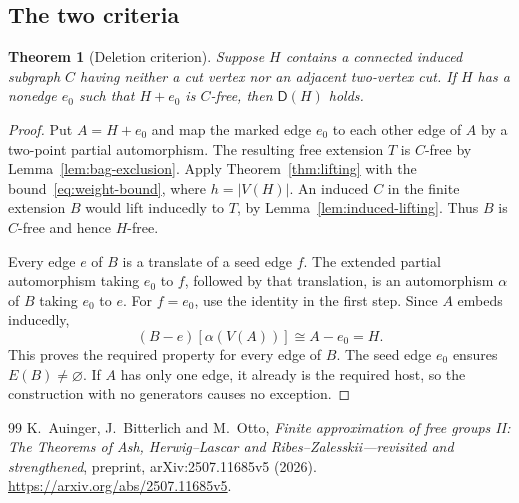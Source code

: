\documentclass[10pt,a4paper]{amsart}
\newtheorem{theorem}{Theorem}[section]
\newcommand{\Dsat}{\mathsf{D}}
\begin{document}
\subsection{The two criteria}


\begin{theorem}[Deletion criterion]\label{thm:deletion-criterion}
Suppose $H$ contains a connected induced subgraph $C$ having neither a cut vertex nor an adjacent two-vertex cut. If $H$ has a nonedge $e_0$ such that $H+e_0$ is $C$-free, then $\Dsat(H)$ holds.
\end{theorem}

\begin{proof}
Put $A=H+e_0$ and map the marked edge $e_0$ to each other edge of $A$ by a two-point partial automorphism. The resulting free extension $T$ is $C$-free by Lemma~\ref{lem:bag-exclusion}. Apply Theorem~\ref{thm:lifting} with the bound~\eqref{eq:weight-bound}, where $h=|V(H)|$. An induced $C$ in the finite extension $B$ would lift inducedly to $T$, by Lemma~\ref{lem:induced-lifting}. Thus $B$ is $C$-free and hence $H$-free.

Every edge $e$ of $B$ is a translate of a seed edge $f$. The extended partial automorphism taking $e_0$ to $f$, followed by that translation, is an automorphism $\alpha$ of $B$ taking $e_0$ to $e$. For $f=e_0$, use the identity in the first step. Since $A$ embeds inducedly,
\[
 (B-e)[\alpha(V(A))]\cong A-e_0=H.
\]
This proves the required property for every edge of $B$. The seed edge $e_0$ ensures $E(B)\ne\varnothing$. If $A$ has only one edge, it already is the required host, so the construction with no generators causes no exception.
\end{proof}

\begin{thebibliography}{99}
 K.~Auinger, J.~Bitterlich and M.~Otto, \emph{Finite approximation of free groups II: The Theorems of Ash, Herwig--Lascar and Ribes--Zalesskii---revisited and strengthened}, preprint, arXiv:2507.11685v5 (2026). \url{https://arxiv.org/abs/2507.11685v5}.
\end{thebibliography}
\end{document}
